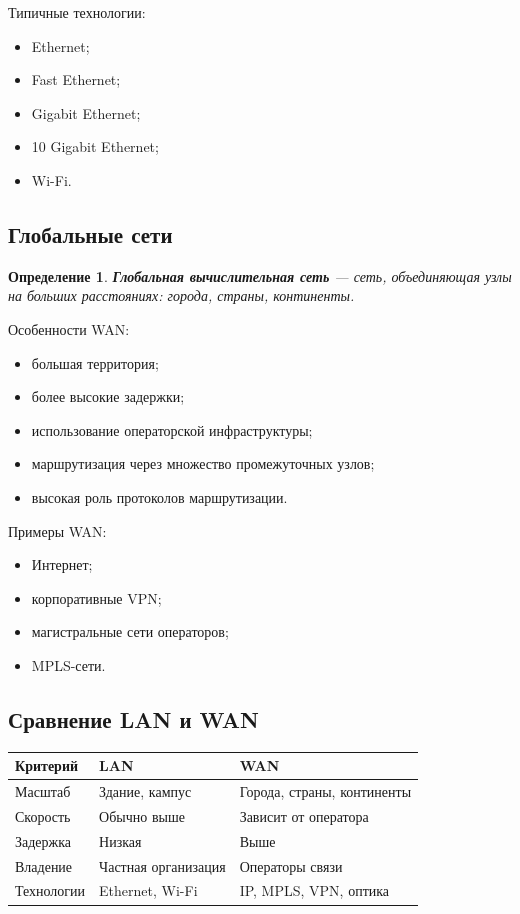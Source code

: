 \documentclass[12pt,a4paper]{article}
\newtheorem{definition}{Определение}
\begin{document}
Типичные технологии:
\begin{itemize}
    \item Ethernet;
    \item Fast Ethernet;
    \item Gigabit Ethernet;
    \item 10 Gigabit Ethernet;
    \item Wi-Fi.
\end{itemize}

\subsection{Глобальные сети}

\begin{definition}
\textbf{Глобальная вычислительная сеть} --- сеть, объединяющая узлы на больших расстояниях: города, страны, континенты.
\end{definition}

Особенности WAN:
\begin{itemize}
    \item большая территория;
    \item более высокие задержки;
    \item использование операторской инфраструктуры;
    \item маршрутизация через множество промежуточных узлов;
    \item высокая роль протоколов маршрутизации.
\end{itemize}

Примеры WAN:
\begin{itemize}
    \item Интернет;
    \item корпоративные VPN;
    \item магистральные сети операторов;
    \item MPLS-сети.
\end{itemize}

\subsection{Сравнение LAN и WAN}

\begin{center}
\begin{tabular}{lll}
\toprule
Критерий & LAN & WAN \\
\midrule
Масштаб & Здание, кампус & Города, страны, континенты \\
Скорость & Обычно выше & Зависит от оператора \\
Задержка & Низкая & Выше \\
Владение & Частная организация & Операторы связи \\
Технологии & Ethernet, Wi-Fi & IP, MPLS, VPN, оптика \\
\bottomrule
\end{tabular}
\end{center}
\end{document}
